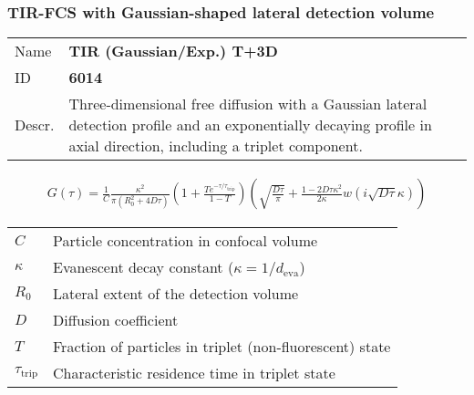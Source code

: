 \subsubsection{TIR-FCS with Gaussian-shaped lateral detection volume}


\noindent \begin{tabular}{lp{}}
Name & \textbf{TIR (Gaussian/Exp.) T+3D} \\ 
ID & \textbf{6014} \\ 
Descr. &  Three-dimensional free diffusion with a Gaussian lateral detection profile and an exponentially decaying profile in axial direction, including a triplet component\cite{Starr2001, Hassler2005, Ohsugi2006}. \\ 
\end{tabular}
\begin{align}
G(\tau) = \frac{1}{C}  \frac{ \kappa^2}{ \pi (R_0^2 +4D\tau)} \left(1 + \frac{T e^{-\tau/\tau_\mathrm{trip}}}{1-T}  \right)
 \left( \sqrt{\frac{D \tau}{\pi}} + \frac{1 - 2 D \tau \kappa^2}{2 \kappa}  w\!\left(i \sqrt{D \tau} \kappa\right) \right)
\end{align} 
\begin{center}
\begin{tabular}{ll}
$C$ & Particle concentration in confocal volume \\ 
$\kappa$ &  Evanescent decay constant ($\kappa = 1/d_\mathrm{eva}$)\\ 
$R_0$ & Lateral extent of the detection volume \\
$D$ & Diffusion coefficient  \\
$T$ &  Fraction of particles in triplet (non-fluorescent) state\\ 
$\tau_\mathrm{trip}$ &  Characteristic residence time in triplet state \\ 
\end{tabular}
\end{center}
\vspace{2em}



